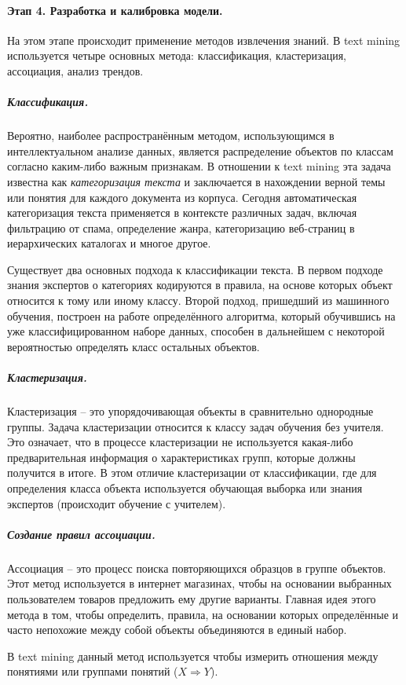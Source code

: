 	
\paragraph{Этап 4. Разработка и калибровка модели.} На этом этапе происходит применение методов извлечения знаний. В text mining используется четыре основных метода: классификация, кластеризация, ассоциация, анализ трендов.
	
	\subparagraph{Классификация.} Вероятно, наиболее распространённым методом, использующимся в интеллектуальном анализе данных, является распределение объектов по классам согласно каким-либо важным признакам. В отношении к text mining эта задача известна как \textit{категоризация текста} и заключается в нахождении верной темы или понятия для каждого документа из корпуса. Сегодня автоматическая категоризация текста применяется в контексте различных задач, включая фильтрацию от спама, определение жанра, категоризацию веб-страниц в иерархических каталогах и многое другое.
	
	Существует два основных подхода к классификации текста. В первом подходе знания экспертов о категориях кодируются в правила, на основе которых объект относится к тому или иному классу. Второй подход, пришедший из машинного обучения, построен на работе определённого алгоритма, который обучившись на уже классифицированном наборе данных, способен в дальнейшем с некоторой вероятностью определять класс остальных объектов.
	
	\subparagraph{Кластеризация.} Кластеризация -- это упорядочивающая объекты в сравнительно однородные группы. Задача кластеризации относится к классу задач обучения без учителя. Это означает, что в процессе кластеризации не используется какая-либо предварительная информация о характеристиках групп, которые должны получится в итоге. В этом отличие кластеризации от классификации, где для определения класса объекта используется обучающая выборка или знания экспертов (происходит обучение с учителем).
	
	\subparagraph{Создание правил ассоциации.} Ассоциация -- это процесс поиска повторяющихся образцов в группе объектов. Этот метод используется в интернет магазинах, чтобы на основании выбранных пользователем товаров предложить ему другие	 варианты. Главная идея этого метода в том, чтобы определить, правила, на основании которых определённые и часто непохожие между собой объекты объединяются в единый набор.
	
	В text mining данный метод используется чтобы измерить отношения между понятиями или группами понятий ($X \Rightarrow Y$).

